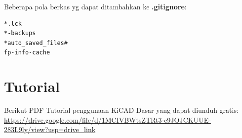 \documentclass[12pt]{book}
\begin{document}
	Beberapa pola berkas yg dapat ditambahkan ke \textbf{.gitignore}:
	
	\begin{verbatim}
*.lck
*-backups
*auto_saved_files#
fp-info-cache
	\end{verbatim}
	
	\section{Tutorial}
	
	Berikut PDF Tutorial penggunaan KiCAD Dasar yang dapat diunduh gratis: \\
	\url{https://drive.google.com/file/d/1MCIVBWtsZTRt3-c9JOJCKUUE-283L9ly/view?usp=drive_link}
	
	
\end{document}
